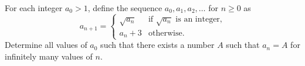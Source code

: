 For each integer $a_0>1$, define the sequence $a_0,a_1,a_2,\ldots$ for $n\geq0$ as \[a_{n+1}=\begin{cases}\sqrt{a_n}&\text{if }\sqrt{a_n}\text{ is an integer,}\\a_n+3&\text{otherwise.}\end{cases}\] Determine all values of $a_0$ such that there exists a number $A$ such that $a_n=A$ for infinitely many values of $n$.